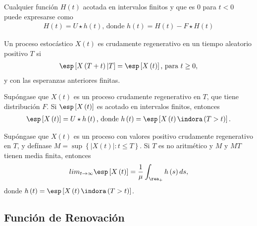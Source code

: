 \begin{Prop}
Cualquier funci\'on $H\left(t\right)$ acotada en intervalos finitos y que es 0 para $t<0$ puede expresarse como
\begin{eqnarray*}
H\left(t\right)=U\star h\left(t\right)\textrm{,  donde }h\left(t\right)=H\left(t\right)-F\star H\left(t\right)
\end{eqnarray*}
\end{Prop}

\begin{Def}
Un proceso estoc\'astico $X\left(t\right)$ es crudamente regenerativo en un tiempo aleatorio positivo $T$ si
\begin{eqnarray*}
\esp\left[X\left(T+t\right)|T\right]=\esp\left[X\left(t\right)\right]\textrm{, para }t\geq0,\end{eqnarray*}
y con las esperanzas anteriores finitas.
\end{Def}

\begin{Prop}
Sup\'ongase que $X\left(t\right)$ es un proceso crudamente regenerativo en $T$, que tiene distribuci\'on $F$. Si $\esp\left[X\left(t\right)\right]$ es acotado en intervalos finitos, entonces
\begin{eqnarray*}
\esp\left[X\left(t\right)\right]=U\star h\left(t\right)\textrm{,  donde }h\left(t\right)=\esp\left[X\left(t\right)\indora\left(T>t\right)\right].
\end{eqnarray*}
\end{Prop}

\begin{Teo}
Sup\'ongase que $X\left(t\right)$ es un proceso con valores positivo crudamente regenerativo en $T$, y def\'inase $M=\sup\left\{|X\left(t\right)|:t\leq T\right\}$. Si $T$ es no aritm\'etico y $M$ y $MT$ tienen media finita, entonces
\begin{eqnarray*}
lim_{t\rightarrow\infty}\esp\left[X\left(t\right)\right]=\frac{1}{\mu}\int_{\rea_{+}}h\left(s\right)ds,
\end{eqnarray*}
donde $h\left(t\right)=\esp\left[X\left(t\right)\indora\left(T>t\right)\right]$.
\end{Teo}



%
\subsection{Funci\'on de Renovaci\'on}
%


